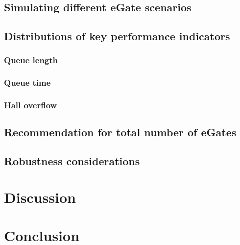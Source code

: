 \documentclass[12pt]{article}
\begin{document}
\subsection{Simulating different eGate scenarios}

\subsection{Distributions of key performance indicators}

\subsubsection{Queue length}
\subsubsection{Queue time}
\subsubsection{Hall overflow}
 

\subsection{Recommendation for total number of eGates}

\subsection{Robustness considerations}

\section{Discussion}
\section{Conclusion}
% 
\end{document}
